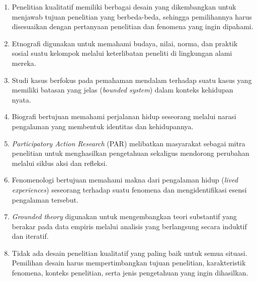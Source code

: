 \documentclass[
  indonesian,
  letterpaper,
  DIV=11,
  numbers=noendperiod]{scrreprt}
\providecommand{\tightlist}{%
  \setlength{\itemsep}{0pt}\setlength{\parskip}{0pt}}
\begin{document}
\begin{tcolorbox}[enhanced jigsaw, colframe=quarto-callout-tip-color-frame, toptitle=1mm, breakable, leftrule=.75mm, arc=.35mm, toprule=.15mm, colback=white, colbacktitle=quarto-callout-tip-color!10!white, bottomtitle=1mm, bottomrule=.15mm, titlerule=0mm, title=\textcolor{quarto-callout-tip-color}{\faLightbulb}\hspace{0.5em}{Rangkuman}, coltitle=black, left=2mm, opacitybacktitle=0.6, opacityback=0, rightrule=.15mm]

\begin{enumerate}
\def\labelenumi{\arabic{enumi}.}
\tightlist
\item
  Penelitian kualitatif memiliki berbagai desain yang dikembangkan untuk
  menjawab tujuan penelitian yang berbeda-beda, sehingga pemilihannya
  harus disesuaikan dengan pertanyaan penelitian dan fenomena yang ingin
  dipahami.
\item
  Etnografi digunakan untuk memahami budaya, nilai, norma, dan praktik
  sosial suatu kelompok melalui keterlibatan peneliti di lingkungan
  alami mereka.
\item
  Studi kasus berfokus pada pemahaman mendalam terhadap suatu kasus yang
  memiliki batasan yang jelas (\emph{bounded system}) dalam konteks
  kehidupan nyata.
\item
  Biografi bertujuan memahami perjalanan hidup seseorang melalui narasi
  pengalaman yang membentuk identitas dan kehidupannya.
\item
  \emph{Participatory Action Research} (PAR) melibatkan masyarakat
  sebagai mitra penelitian untuk menghasilkan pengetahuan sekaligus
  mendorong perubahan melalui siklus aksi dan refleksi.
\item
  Fenomenologi bertujuan memahami makna dari pengalaman hidup
  (\emph{lived experiences}) seseorang terhadap suatu fenomena dan
  mengidentifikasi esensi pengalaman tersebut.
\item
  \emph{Grounded theory} digunakan untuk mengembangkan teori substantif
  yang berakar pada data empiris melalui analisis yang berlangsung
  secara induktif dan iteratif.
\item
  Tidak ada desain penelitian kualitatif yang paling baik untuk semua
  situasi. Pemilihan desain harus mempertimbangkan tujuan penelitian,
  karakteristik fenomena, konteks penelitian, serta jenis pengetahuan
  yang ingin dihasilkan.
\end{enumerate}

\end{tcolorbox}
\end{document}

